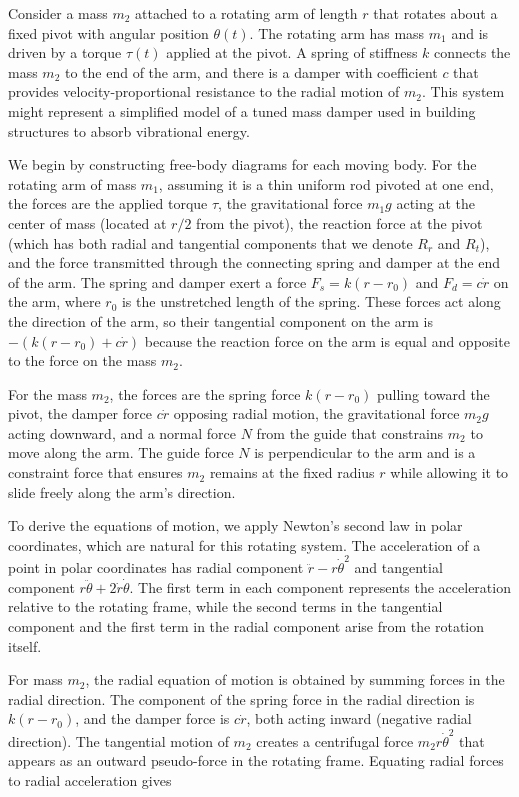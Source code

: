 \begin{example}
Consider a mass $m_2$ attached to a rotating arm of length $r$ that rotates about a fixed pivot with angular position $\theta(t)$. The rotating arm has mass $m_1$ and is driven by a torque $\tau(t)$ applied at the pivot. A spring of stiffness $k$ connects the mass $m_2$ to the end of the arm, and there is a damper with coefficient $c$ that provides velocity-proportional resistance to the radial motion of $m_2$. This system might represent a simplified model of a tuned mass damper used in building structures to absorb vibrational energy.

We begin by constructing free-body diagrams for each moving body. For the rotating arm of mass $m_1$, assuming it is a thin uniform rod pivoted at one end, the forces are the applied torque $\tau$, the gravitational force $m_1g$ acting at the center of mass (located at $r/2$ from the pivot), the reaction force at the pivot (which has both radial and tangential components that we denote $R_r$ and $R_t$), and the force transmitted through the connecting spring and damper at the end of the arm. The spring and damper exert a force $F_s = k(r - r_0)$ and $F_d = c\dot{r}$ on the arm, where $r_0$ is the unstretched length of the spring. These forces act along the direction of the arm, so their tangential component on the arm is $-(k(r - r_0) + c\dot{r})$ because the reaction force on the arm is equal and opposite to the force on the mass $m_2$.

For the mass $m_2$, the forces are the spring force $k(r - r_0)$ pulling toward the pivot, the damper force $c\dot{r}$ opposing radial motion, the gravitational force $m_2g$ acting downward, and a normal force $N$ from the guide that constrains $m_2$ to move along the arm. The guide force $N$ is perpendicular to the arm and is a constraint force that ensures $m_2$ remains at the fixed radius $r$ while allowing it to slide freely along the arm's direction.

To derive the equations of motion, we apply Newton's second law in polar coordinates, which are natural for this rotating system. The acceleration of a point in polar coordinates has radial component $\ddot{r} - r\dot{\theta}^2$ and tangential component $r\ddot{\theta} + 2\dot{r}\dot{\theta}$. The first term in each component represents the acceleration relative to the rotating frame, while the second terms in the tangential component and the first term in the radial component arise from the rotation itself.

For mass $m_2$, the radial equation of motion is obtained by summing forces in the radial direction. The component of the spring force in the radial direction is $k(r - r_0)$, and the damper force is $c\dot{r}$, both acting inward (negative radial direction). The tangential motion of $m_2$ creates a centrifugal force $m_2r\dot{\theta}^2$ that appears as an outward pseudo-force in the rotating frame. Equating radial forces to radial acceleration gives


\end{example}
